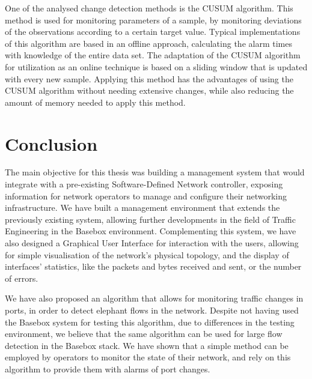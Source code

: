 \documentclass[a4paper]{IEEEtran}
\begin{document}
\par One of the analysed change detection methods is the CUSUM algorithm. This method is used for monitoring parameters of a sample, by monitoring deviations of the
observations according to a certain target value. Typical implementations of this algorithm are based in an offline approach, calculating the alarm times
with knowledge of the entire data set. The adaptation of the CUSUM algorithm for utilization as an online technique is based on a sliding window that
is updated with every new sample. Applying this method has the advantages of using the CUSUM algorithm without needing extensive changes, while also reducing the 
amount of memory needed to apply this method.

\section{Conclusion}
\par The main objective for this thesis was building a management system that would integrate with a pre-existing Software-Defined Network controller, exposing 
information for network operators to manage and configure their networking infrastructure. We have built a management environment that extends the previously 
existing system, allowing further developments in the field of Traffic Engineering in the Basebox environment. Complementing this system, we have also designed a
Graphical User Interface for interaction with the users, allowing for simple visualisation of the network’s physical topology, and the display of interfaces’ 
statistics, like the packets and bytes received and sent, or the number of errors.

\par We have also proposed an algorithm that allows for monitoring traffic changes in ports, in order to detect elephant flows in the network. Despite not having 
used the Basebox system for testing this algorithm, due to differences in the testing environment, we believe that the same algorithm can be used for large flow 
detection in the Basebox stack. We have shown that a simple method can be employed by operators to monitor the state of their network, and rely on this algorithm to
provide them with alarms of port changes.


%
\end{document}
